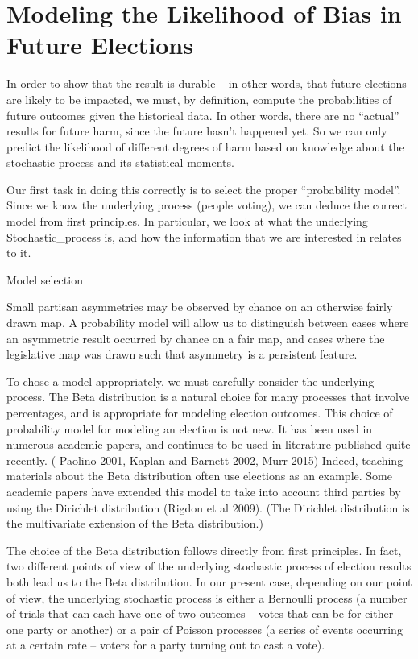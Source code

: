 \documentclass[preprint,12pt]{article}
\begin{document}
\section{Modeling the Likelihood of Bias in Future Elections\label{sec:FB}}
 
In order to show that the result is durable -- in other words, that future elections are likely to be impacted, we must, by definition, compute the probabilities of future outcomes given the historical data.  In other words, there are no “actual” results for future harm, since the future hasn’t happened yet.  So we can only predict the likelihood of different degrees of harm based on knowledge about the stochastic process and its statistical moments.
 
Our first task in doing this correctly is to select the proper “probability model”.  Since we know the underlying process (people voting), we can deduce the correct model from first principles.  In particular, we look at what the underlying Stochastic_process is, and how the information that we are interested in relates to it.
 
Model selection
 
Small partisan asymmetries may be observed by chance on an otherwise fairly drawn map. A probability model will allow us to distinguish between cases where an asymmetric result occurred by chance on a fair map, and cases where the legislative map was drawn such that asymmetry is a persistent feature. 
 
To chose a model appropriately, we must carefully consider the underlying process. The Beta distribution is a natural choice for many processes that involve percentages, and is appropriate for modeling election outcomes. This choice of probability model for modeling an election is not new. It has been used in numerous academic papers, and continues to be used in literature published quite recently. ( Paolino 2001, Kaplan and Barnett 2002, Murr 2015)  Indeed, teaching materials about the Beta distribution often use elections as an example.  Some academic papers have extended this model to take into account third parties by using the Dirichlet distribution (Rigdon et al 2009).  (The Dirichlet distribution is the multivariate extension of the Beta distribution.) 
 
The choice of the Beta distribution follows directly from first principles. In fact, two different points of view of the underlying stochastic process of election results both lead us to the Beta distribution. In our present case, depending on our point of view, the underlying stochastic process is either a Bernoulli process (a number of trials that can each have one of two outcomes -- votes that can be for either one party or another) or a pair of Poisson processes (a series of events occurring at a certain rate -- voters for a party turning out to cast a vote).  
 
\end{document}

